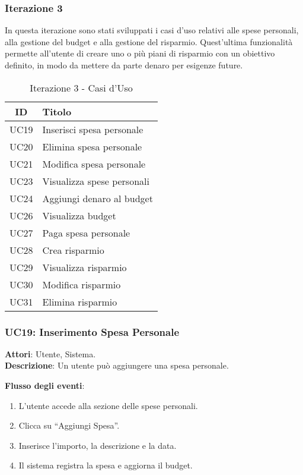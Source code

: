 \subsubsection{Iterazione 3}
In questa iterazione sono stati sviluppati i casi d’uso relativi alle spese personali, alla gestione del budget e alla gestione del risparmio. Quest’ultima funzionalità permette all’utente di creare uno o più piani di risparmio con un obiettivo definito, in modo da mettere da parte denaro per esigenze future.

\begin{table}[h]
    \centering
    \begin{tabular}{|c|l|}
    \hline
    \textbf{ID} & \textbf{Titolo} \\ \hline
    UC19 & Inserisci spesa personale \\ \hline
    UC20 & Elimina spesa personale \\ \hline
    UC21 & Modifica spesa personale \\ \hline
    UC23 & Visualizza spese personali \\ \hline
    UC24 & Aggiungi denaro al budget \\ \hline
    UC26 & Visualizza budget \\ \hline
    UC27 & Paga spesa personale \\ \hline
    UC28 & Crea risparmio \\ \hline
    UC29 & Visualizza risparmio \\ \hline
    UC30 & Modifica risparmio \\ \hline
    UC31 & Elimina risparmio \\ \hline
    \end{tabular}
    \caption{Iterazione 3 - Casi d’Uso}
\end{table}

\subsubsection{UC19: Inserimento Spesa Personale}
\textbf{Attori}: Utente, Sistema. \\
\textbf{Descrizione}: Un utente può aggiungere una spesa personale.

\textbf{Flusso degli eventi}:
\begin{enumerate}
    \item L’utente accede alla sezione delle spese personali.
    \item Clicca su ``Aggiungi Spesa''.
    \item Inserisce l’importo, la descrizione e la data.
    \item Il sistema registra la spesa e aggiorna il budget.
\end{enumerate}

